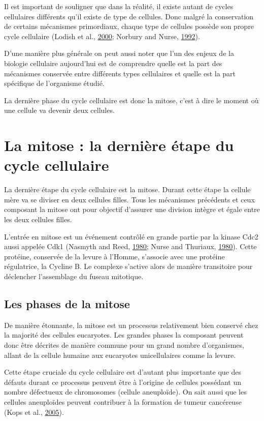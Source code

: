 \documentclass[12pt,a4paper,twoside,openright]{book}
\begin{document}
Il est important de souligner que dans la réalité, il existe autant de
cycles cellulaires différents qu'il existe de type de cellules. Donc
malgré la conservation de certains mécanismes primordiaux, chaque type
de cellules possède son propre cycle cellulaire (Lodish et al.,
\hyperref[ref-Lodish2000]{2000}; Norbury and Nurse,
\hyperref[ref-Norbury1992]{1992}).

D'une manière plus générale on peut aussi noter que l'un des enjeux de
la biologie cellulaire aujourd'hui est de comprendre quelle est la part
des mécanismes conservée entre différents types cellulaires et quelle
est la part spécifique de l'organisme étudié.

La dernière phase du cycle cellulaire est donc la mitose, c'est à dire
le moment où une cellule va devenir deux cellules.

\section{La mitose : la dernière étape du cycle
cellulaire}\label{la-mitose-la-derniuxe8re-uxe9tape-du-cycle-cellulaire}

La dernière étape du cycle cellulaire est la mitose. Durant cette étape
la cellule mère va se diviser en deux cellules filles. Tous les
mécanismes précédents et ceux composant la mitose ont pour objectif
d'assurer une division intègre et égale entre les deux cellules filles.

L'entrée en mitose est un événement contrôlé en grande partie par la
kinase Cdc2 aussi appelée Cdk1 (Nasmyth and Reed,
\hyperref[ref-Nasmyth1980]{1980}; Nurse and Thuriaux,
\hyperref[ref-Nurse1980]{1980}). Cette protéine, conservée de la levure
à l'Homme, s'associe avec une protéine régulatrice, la Cycline B. Le
complexe s'active alors de manière transitoire pour déclencher
l'assemblage du fuseau mitotique.

\subsection{Les phases de la mitose}\label{les-phases-de-la-mitose}

De manière étonnante, la mitose est un processus relativement bien
conservé chez la majorité des cellules eucaryotes. Les grandes phases la
composant peuvent donc être décrites de manière commune pour un grand
nombre d'organismes, allant de la cellule humaine aux eucaryotes
unicellulaires comme la levure.

Cette étape cruciale du cycle cellulaire est d'autant plus importante
que des défauts durant ce processus peuvent être à l'origine de cellules
possédant un nombre défectueux de chromosomes (cellule aneuploïde). On
sait aussi que les cellules aneuploïdes peuvent contribuer à la
formation de tumeur cancéreuse (Kops et al.,
\hyperref[ref-Kops2005]{2005}).
\end{document}
